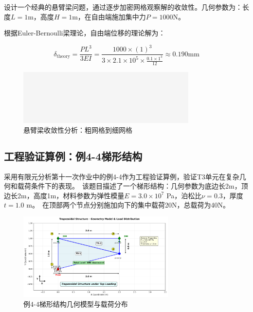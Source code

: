 \documentclass[12pt,a4paper]{article}
\begin{document}
设计一个经典的悬臂梁问题，通过逐步加密网格观察解的收敛性。几何参数为：长度$L = 1$m，高度$H = 1$m，在自由端施加集中力$P = 1000$N。

根据Euler-Bernoulli梁理论，自由端位移的理论解为：

\begin{equation}
\delta_{\text{theory}} = \frac{PL^3}{3EI} = \frac{1000 \times (1)^3}{3 \times 2.1 \times 10^5 \times \frac{0.1 \times 1^3}{12}} \approx 0.190 \text{mm}
\end{equation}

\begin{figure}[H]
\centering
\includegraphics[width=0.8\textwidth]{img/empty.png}
\caption{悬臂梁收敛性分析：粗网格到细网格}
\label{fig:convergence_meshes}
\end{figure}

\subsection{工程验证算例：例4-4梯形结构}

采用有限元分析第十一次作业中的例4-4作为工程验证算例，验证T3单元在复杂几何和载荷条件下的表现。\
该题目描述了一个梯形结构：几何参数为底边长2m，顶边长2m，高度1m，材料参数为弹性模量$E = 3.0 \times 10^7$ Pa，泊松比$\nu = 0.3$，厚度$t = 1.0$ m。\
在顶部两个节点分别施加向下的集中载荷20N，总载荷为40N。

\begin{figure}[H]
\centering
\includegraphics[width=0.7\textwidth]{img/wzy_geometry_model.png}
\caption{例4-4梯形结构几何模型与载荷分布}
\label{fig:wzy_model}
\end{figure}
\end{document}
